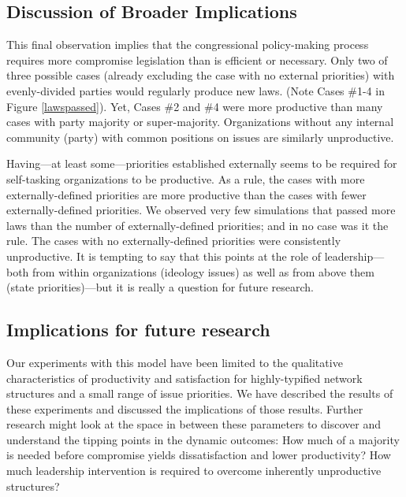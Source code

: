 \documentclass[pdftex,12pt]{llncs}
\begin{document}
\subsection{Discussion of Broader Implications}
This final observation implies that the congressional policy-making process requires more compromise legislation than is efficient or necessary. 
Only two of three possible cases (already excluding the case with no external priorities) with evenly-divided parties would regularly produce new laws. 
(Note Cases \#1-4 in Figure \ref{lawspassed}). 
Yet, Cases \#2 and \#4 were more productive than many cases with party majority or super-majority.  
Organizations without any internal community (party) with common positions on issues are similarly unproductive.

Having---at least some---priorities established externally seems to be required for self-tasking organizations to be productive. 
As a rule, the cases with more externally-defined priorities are more productive than the cases with fewer externally-defined priorities. 
We observed very few simulations that passed more laws than the number of externally-defined priorities; and in no case was it the rule. 
The cases with no externally-defined priorities were consistently unproductive. 
It is tempting to say that this points at the role of leadership---both from within organizations (ideology issues) as well as from above them (state priorities)---but it is really a question for future research.  

\subsection{Implications for future research}
Our experiments with this model have been limited to the qualitative characteristics of productivity and satisfaction for highly-typified network structures and a small range of issue priorities.
We have described the results of these experiments and discussed the implications of those results.
Further research might look at the space in between these parameters to discover and understand the tipping points in the dynamic outcomes:
How much of a majority is needed before compromise yields dissatisfaction and lower productivity? 
How much leadership intervention is required to overcome inherently unproductive structures?
\end{document}

